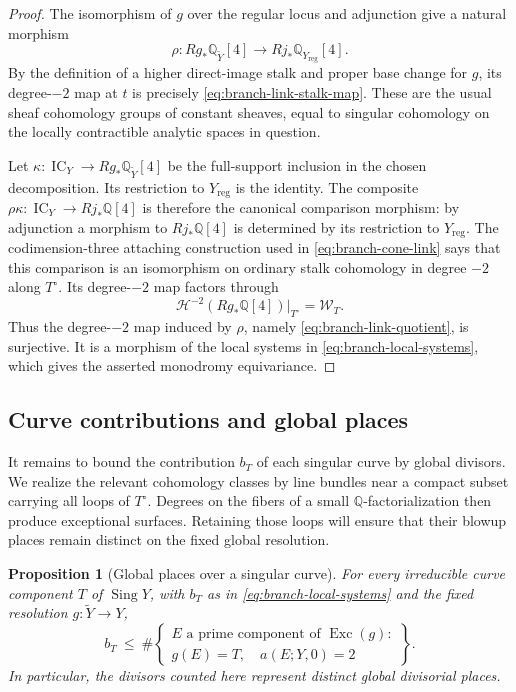\documentclass[11pt]{amsart}
\newtheorem{proposition}[theorem]{Proposition}
\theoremstyle{definition}
\theoremstyle{remark}
\numberwithin{equation}{section}
\newcommand{\Q}{\mathbb{Q}}
\DeclareMathOperator{\Exc}{Exc}
\DeclareMathOperator{\Sing}{Sing}
\DeclareMathOperator{\IC}{IC}
\begin{document}
\begin{proof}
The isomorphism of $g$ over the regular locus and adjunction give a
natural morphism
\[
 \rho\colon Rg_*\Q_{\widetilde Y}[4]
                     \longrightarrow Rj_*\Q_{Y_{\mathrm{reg}}}[4].
\]
By the definition of a higher direct-image stalk and proper base
change for $g$, its degree-$-2$ map at $t$ is precisely
\eqref{eq:branch-link-stalk-map}.  These are the usual sheaf
cohomology groups of constant sheaves, equal to singular cohomology
on the locally contractible analytic spaces in question.

Let $\kappa\colon\IC_Y\to Rg_*\Q_{\widetilde Y}[4]$ be the
full-support inclusion in the chosen decomposition.  Its restriction
to $Y_{\mathrm{reg}}$ is the identity.  The composite
$\rho\kappa\colon\IC_Y\to Rj_*\Q[4]$ is therefore the canonical
comparison morphism: by adjunction a morphism to $Rj_*\Q[4]$ is
determined by its restriction to $Y_{\mathrm{reg}}$.  The
codimension-three attaching construction used in
\eqref{eq:branch-cone-link} says that this comparison is an
isomorphism on ordinary stalk cohomology in degree $-2$ along
$T^\circ$.  Its degree-$-2$ map factors through
\[
 \mathcal H^{-2}(Rg_*\Q[4])|_{T^\circ}=\mathcal W_T.
\]
Thus the degree-$-2$ map induced by $\rho$, namely
\eqref{eq:branch-link-quotient}, is surjective.  It is a morphism of
the local systems in \eqref{eq:branch-local-systems}, which gives
the asserted monodromy equivariance.
\end{proof}

\subsection{Curve contributions and global places}
\label{subsec:curve-places}

It remains to bound the contribution \(b_T\) of each singular curve by
global divisors.  We realize the relevant cohomology classes by line
bundles near a compact subset carrying all loops of \(T^\circ\).  Degrees
on the fibers of a small \(\Q\)-factorialization then produce exceptional
surfaces.  Retaining those loops will ensure that their blowup places
remain distinct on the fixed global resolution.

\begin{proposition}[Global places over a singular curve]\label{prop:curve-places}
For every irreducible curve component \(T\) of \(\Sing Y\), with \(b_T\)
as in \eqref{eq:branch-local-systems} and the fixed resolution
\(g:\widetilde Y\to Y\),
\[
 b_T\ \le\
 \#\left\{
 \begin{array}{c}
 E\text{ a prime component of }\Exc(g):\\
 g(E)=T,\quad a(E;Y,0)=2
 \end{array}
 \right\}.
\]
In particular, the divisors counted here represent distinct global
divisorial places.
\end{proposition}
\end{document}

